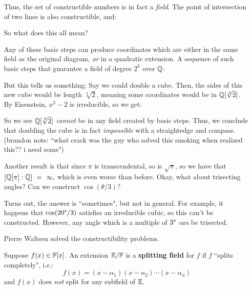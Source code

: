 \centering
{}
\flushleft

Thus, the set of constructible numbers is in fact a \textit{field}.
The point of intersection of two lines is also constructible, and:

\centering
{}
\flushleft

So what does this all mean?

Any of these basic steps can produce coordinates which are either in the same
field as the original diagram, \textit{or} in a quadratic extension.
A sequence of such basic steps that guarantee a field of degree $ 2^{k} $ over
$ \mathbb{Q} $:

\centering
{}
\flushleft

But this tells us something: Say we could double a cube. Then, the sides of this
new cube would be length $ \sqrt[3]{2} $, meaning some coordinates would be in
$ \mathbb{Q}[\sqrt[3]{2}] $. By Eisenstein, $ x^{3}-2 $ is irreducible, so we get:

\centering
{}
\flushleft

So we see $ \mathbb{Q}[\sqrt[3]{2}] $ \textit{cannot} be in any field created by basic
steps. Thus, we conclude that doubling the cube is in fact \textit{impossible}
with a straightedge and compass.
(brandon note: ``what crack was the guy who solved this smoking when realized
this?? i need some")

Another result is that since $ \pi $ is transcendental, so is $ \sqrt{\pi} $, so
we have that $ [\bQ[\pi]:\bQ] \ = \ \infty, $ which is even worse than before.
Okay, what about trisecting angles? Can we construct $ \cos(\theta/3) $?

Turns out, the answer is ``sometimes", but not in general. For example,
it happens that $ \cos(20\degree/3) $ satisfies an irreducible cubic, so this
can't be constructed. However, any angle which is a multiple of $ 3\degree $
\textit{can} be trisected.

Pierre Waltsen solved the constructibility problems.

\begin{defn}
    Suppose $ f(x) \in \mathbb{F}[x] $. An extension $ \mathbb{E}/\mathbb{F} $ is a
    \textbf{splitting field} for $ f $ if $ f $ ``splits completely", i.e.:
    \begin{equation*}
        f(x) = (x-\alpha_{1})(x-\alpha_{2})\cdots(x-\alpha_{n})
    \end{equation*}
    and $ f(x) $ does \textit{not} split for any subfield of $ \mathbb{E} $.
\end{defn}

